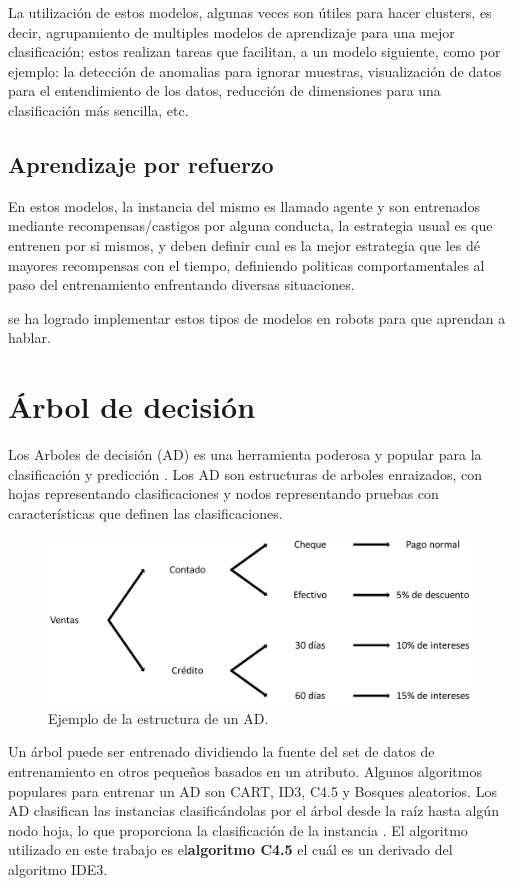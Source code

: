 \documentclass[twoside,spanish,ESP,MSc]{plantillaLabUPV}
\theoremstyle{definition}
\begin{document}
La utilización de estos modelos, algunas veces son útiles para hacer clusters, es decir, agrupamiento de multiples modelos de aprendizaje para una mejor clasificación; estos realizan tareas que facilitan, a un modelo siguiente, como por ejemplo: la detección de anomalias para ignorar muestras, visualización de datos para el entendimiento de los datos, reducción de dimensiones para una clasificación más sencilla, etc.

\subsection{Aprendizaje por refuerzo}

En estos modelos, la instancia del mismo es llamado agente y son entrenados mediante recompensas/castigos por alguna conducta, la estrategia usual es que entrenen por si mismos, y deben definir cual es la mejor estrategia que les dé mayores recompensas con el tiempo, definiendo politicas comportamentales al paso del entrenamiento enfrentando diversas situaciones.

se ha logrado implementar estos tipos de modelos en robots para que aprendan a hablar.


\section{Árbol de decisión}

Los Arboles de decisión (AD) es una herramienta poderosa y popular para la clasificación y predicción \cite{cart84}. Los AD son estructuras de arboles enraizados, con hojas representando clasificaciones y nodos representando pruebas con características que definen las clasificaciones.

\begin{figure}[h] 
	\centering 
		\includegraphics[scale=.30]{ima/add} 
	\caption{Ejemplo de la estructura de un AD.} 
	\label{add} 
\end{figure}


Un árbol puede ser entrenado dividiendo la fuente del set de datos de entrenamiento en otros pequeños basados en un atributo. Algunos algoritmos populares para entrenar un AD son CART, ID3, C4.5 y Bosques aleatorios.  Los AD clasifican las instancias clasificándolas por el árbol desde la raíz hasta algún nodo hoja, lo que proporciona la clasificación de la instancia \cite{Mitchell:1997:ML:541177}. El algoritmo utilizado en este trabajo es el\textbf{algoritmo C4.5} el cuál es un derivado del algoritmo IDE3.
\end{document}
